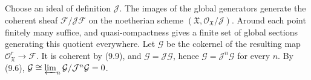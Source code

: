 Choose an ideal of definition $\mathcal J$. The images of the global generators generate the coherent sheaf $\mathcal F/\mathcal J\mathcal F$ on the noetherian scheme $(\mathfrak X,\mathcal O_{\mathfrak X}/\mathcal J)$. Around each point finitely many suffice, and quasi-compactness gives a finite set of global sections generating this quotient everywhere. Let $\mathcal G$ be the cokernel of the resulting map $\mathcal O_{\mathfrak X}^r\to\mathcal F$. It is coherent by (9.9), and $\mathcal G=\mathcal J\mathcal G$, hence $\mathcal G=\mathcal J^n\mathcal G$ for every $n$. By (9.6), $\mathcal G\cong\varprojlim_n\mathcal G/\mathcal J^n\mathcal G=0$.

